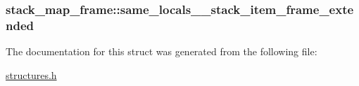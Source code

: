\subsubsection[{\texorpdfstring{same\+\_\+locals\+\_\+1\+\_\+stack\+\_\+item\+\_\+frame\+\_\+extended}{same_locals_1_stack_item_frame_extended}}]{ stack\+\_\+map\+\_\+frame\+::same\+\_\+locals\+\_\+\_\+stack\+\_\+item\+\_\+frame\+\_\+extended}\hypertarget{structstack__map__frame_acb0262b85b6ddf629227b4e269107c4d}{}\label{structstack__map__frame_acb0262b85b6ddf629227b4e269107c4d}


The documentation for this struct was generated from the following file\+:\begin{DoxyCompactItemize}
\item 
\hyperlink{structures_8h}{structures.\+h}\end{DoxyCompactItemize}
